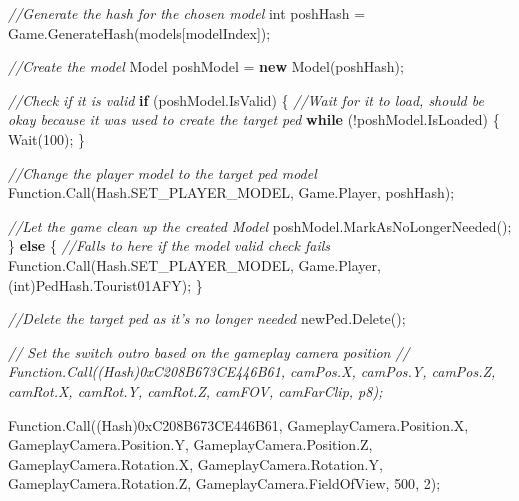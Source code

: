 \documentclass[
  openany]{book}
\newenvironment{Shaded}{\begin{snugshade}}{\end{snugshade}}
\newcommand{\BaseNTok}[1]{\textcolor[rgb]{0.00,0.00,0.81}{#1}}
\newcommand{\CommentTok}[1]{\textcolor[rgb]{0.56,0.35,0.01}{\textit{#1}}}
\newcommand{\DataTypeTok}[1]{\textcolor[rgb]{0.13,0.29,0.53}{#1}}
\newcommand{\DecValTok}[1]{\textcolor[rgb]{0.00,0.00,0.81}{#1}}
\newcommand{\FunctionTok}[1]{\textcolor[rgb]{0.00,0.00,0.00}{#1}}
\newcommand{\KeywordTok}[1]{\textcolor[rgb]{0.13,0.29,0.53}{\textbf{#1}}}
\newcommand{\NormalTok}[1]{#1}
\begin{document}
\begin{Shaded}
\begin{Highlighting}[]
                    \CommentTok{//Generate the hash for the chosen model}
                    \DataTypeTok{int}\NormalTok{ poshHash = Game.}\FunctionTok{GenerateHash}\NormalTok{(models[modelIndex]);}

                    \CommentTok{//Create the model}
\NormalTok{                    Model poshModel = }\KeywordTok{new} \FunctionTok{Model}\NormalTok{(poshHash);}

                    \CommentTok{//Check if it is valid}
                    \KeywordTok{if}\NormalTok{ (poshModel.}\FunctionTok{IsValid}\NormalTok{)}
\NormalTok{                    \{}
                        \CommentTok{//Wait for it to load, should be okay because it was used to create the target ped}
                        \KeywordTok{while}\NormalTok{ (!poshModel.}\FunctionTok{IsLoaded}\NormalTok{)}
\NormalTok{                        \{}
                            \FunctionTok{Wait}\NormalTok{(}\DecValTok{100}\NormalTok{);}
\NormalTok{                        \}}

                        \CommentTok{//Change the player model to the target ped model}
\NormalTok{                        Function.}\FunctionTok{Call}\NormalTok{(Hash.}\FunctionTok{SET_PLAYER_MODEL}\NormalTok{, Game.}\FunctionTok{Player}\NormalTok{, poshHash);}

                        \CommentTok{//Let the game clean up the created Model}
\NormalTok{                        poshModel.}\FunctionTok{MarkAsNoLongerNeeded}\NormalTok{();}
\NormalTok{                    \}}
                    \KeywordTok{else}
\NormalTok{                    \{}
                        \CommentTok{//Falls to here if the model valid check fails}
\NormalTok{                        Function.}\FunctionTok{Call}\NormalTok{(Hash.}\FunctionTok{SET_PLAYER_MODEL}\NormalTok{, Game.}\FunctionTok{Player}\NormalTok{, (}\DataTypeTok{int}\NormalTok{)PedHash.}\FunctionTok{Tourist01AFY}\NormalTok{);}
\NormalTok{                    \}}

                    \CommentTok{//Delete the target ped as it's no longer needed}
\NormalTok{                    newPed.}\FunctionTok{Delete}\NormalTok{();}
                    

                    \CommentTok{// Set the switch outro based on the gameplay camera position}
                    \CommentTok{// Function.Call((Hash)0xC208B673CE446B61, camPos.X, camPos.Y, camPos.Z, camRot.X, camRot.Y, camRot.Z, camFOV, camFarClip, p8);}

\NormalTok{                    Function.}\FunctionTok{Call}\NormalTok{((Hash)}\BaseNTok{0xC208B673CE446B61}\NormalTok{, GameplayCamera.}\FunctionTok{Position}\NormalTok{.}\FunctionTok{X}\NormalTok{, GameplayCamera.}\FunctionTok{Position}\NormalTok{.}\FunctionTok{Y}\NormalTok{, GameplayCamera.}\FunctionTok{Position}\NormalTok{.}\FunctionTok{Z}\NormalTok{, GameplayCamera.}\FunctionTok{Rotation}\NormalTok{.}\FunctionTok{X}\NormalTok{, GameplayCamera.}\FunctionTok{Rotation}\NormalTok{.}\FunctionTok{Y}\NormalTok{, GameplayCamera.}\FunctionTok{Rotation}\NormalTok{.}\FunctionTok{Z}\NormalTok{, GameplayCamera.}\FunctionTok{FieldOfView}\NormalTok{, }\DecValTok{500}\NormalTok{, }\DecValTok{2}\NormalTok{);}


\end{Highlighting}
\end{Shaded}
\end{document}
